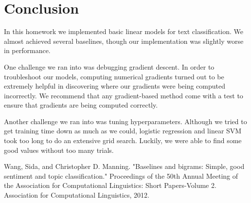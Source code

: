 \documentclass[11pt]{article}
\begin{document}


\section{Conclusion}


In this homework we implemented basic linear models for text classification. We almost achieved several baselines, though our implementation was slightly worse in performance.

One challenge we ran into was debugging gradient descent. In order to troubleshoot our models, computing numerical gradients turned out to be extremely helpful in discovering where our gradients were being computed incorrectly. We recommend that any gradient-based method come with a test to ensure that gradients are being computed correctly.

Another challenge we ran into was tuning hyperparameters. Although we tried to get training time down as much as we could, logistic regression and linear SVM took too long to do an extensive grid search. Luckily, we were able to find some good values without too many trials. 



Wang, Sida, and Christopher D. Manning. "Baselines and bigrams: Simple, good sentiment and topic classification." Proceedings of the 50th Annual Meeting of the Association for Computational Linguistics: Short Papers-Volume 2. Association for Computational Linguistics, 2012.
\end{document}
